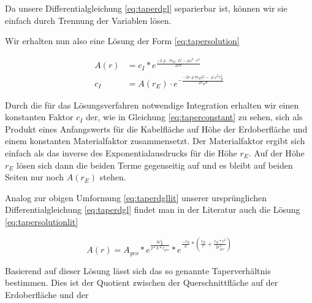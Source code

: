\documentclass[a4paper, 10pt]{report}
\begin{document}
Da unsere Differentialgleichung \ref{eq:taperdgl} separierbar ist, können wir sie einfach durch Trennung der Variablen lösen.


Wir erhalten nun also eine Lösung der Form \ref{eq:tapersolution}

\begin{align}
A(r) &= c_I * e^{\frac{-2\varrho \cdot m_E \cdot G - \rho \omega^2 \cdot r^3}{2 r \sigma}}\label{eq:tapersolution}\\
c_I &= A(r_E) \cdot e^{-\frac{-2 c \varrho m_E G - \varrho \omega^2 r_E^3}{2 r_E \sigma}}
\label{eq:taperconstant}
\end{align}

Durch die für das Lösungsverfahren notwendige Integration erhalten wir einen konstanten Faktor $c_I$ der, wie in Gleichung \ref{eq:taperconstant} zu sehen, sich als Produkt eines Anfangswerts für die Kabelfläche auf Höhe der Erdoberfläche und einem konstanten Materialfaktor zusammensetzt. Der Materialfaktor ergibt sich einfach als das inverse des Exponentialausdrucks für die Höhe $r_E$. Auf der Höhe $r_E$ lösen sich dann die beiden Terme gegenseitig auf und es bleibt auf beiden Seiten nur noch $A(r_E)$ stehen.

Analog zur obigen Umformung \ref{eq:taperdgllit} unserer ursprünglichen Differentialgleichung \ref{eq:taperdgl} findet man in der Literatur auch die Lösung \ref{eq:tapersolutionlit}

\begin{equation}
A(r)=A_{geo}*e^\frac{3r_E^2}{2*h*r_{geo}}*e^{\frac{-r_E}{h}*(\frac{r_E}{r}+\frac{r_E*r^2}{2r_{geo}^3})}
\label{eq:tapersolutionlit}
\end{equation}

Basierend auf dieser Lösung lässt sich das so genannte Taperverhältnis bestimmen. Dies ist der Quotient zwischen der Querschnittfläche auf der Erdoberfläche und der 
\end{document}

